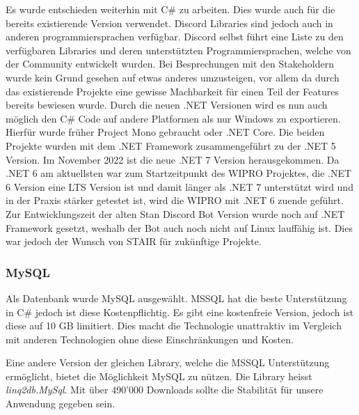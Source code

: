 \documentclass[a4paper, table]{article}
\begin{document}
Es wurde entschieden weiterhin mit C\# zu arbeiten.
Dies wurde auch für die bereits existierende Version verwendet.
Discord Libraries sind jedoch auch in anderen programmiersprachen verfügbar.
Discord selbst führt eine Liste zu den verfügbaren Libraries und deren unterstützten Programmiersprachen, welche von der Community entwickelt wurden.\autocite{noauthor_discord_2022-1}
Bei Besprechungen mit den Stakeholdern wurde kein Grund gesehen auf etwas anderes umzusteigen, vor allem da durch das existierende Projekte eine gewisse Machbarkeit für einen Teil der Features bereits bewiesen wurde.
Durch die neuen .NET Versionen wird es nun auch möglich den C\# Code auf andere Platformen als nur Windows zu exportieren.
Hierfür wurde früher Project Mono gebraucht oder .NET Core.
Die beiden Projekte wurden mit dem .NET Framework zusammengeführt zu der .NET 5 Version.\autocite{schwichtenberg_net_2019}
Im November 2022 ist die neue .NET 7 Version herausgekommen.
Da .NET 6 am aktuellsten war zum Startzeitpunkt des WIPRO Projektes, die .NET 6 Version eine LTS Version ist und damit länger als .NET 7 unterstützt wird und in der Praxis stärker getestet ist, wird die WIPRO mit .NET 6 zuende geführt.\autocite{noauthor_net_2022}
Zur Entwicklungszeit der alten Stan Discord Bot Version wurde noch auf .NET Framework gesetzt, weshalb der Bot auch noch nicht auf Linux lauffähig ist.
Dies war jedoch der Wunsch von STAIR für zukünftige Projekte.


\subsubsection{MySQL}

Als Datenbank wurde MySQL ausgewählt.
MSSQL hat die beste Unterstützung in C\# jedoch ist diese Kostenpflichtig.
Es gibt eine kostenfreie Version, jedoch ist diese auf 10 GB limitiert.
Dies macht die Technologie unattraktiv im Vergleich mit anderen Technologien ohne diese Einschränkungen und Kosten.\autocite{noauthor_sql_nodate}

Eine andere Version der gleichen Library, welche die MSSQL Unterstützung ermöglicht, bietet die Möglichkeit MySQL zu nützen.
Die Library heisst \textit{linq2db.MySql}.
Mit über 490'000 Downloads sollte die Stabilität für unsere Anwendung gegeben sein.\autocite{noauthor_linq2dbmysql_nodate}
\end{document}
